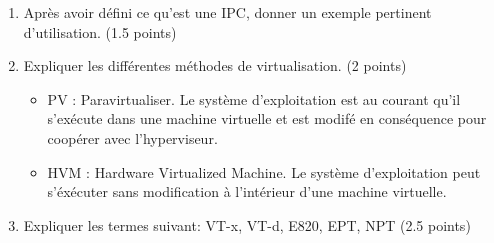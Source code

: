 \begin{enumerate}

\item Après avoir défini ce qu'est une IPC, donner un exemple pertinent d'utilisation. (1.5 points)

\item Expliquer les différentes méthodes de virtualisation. (2 points)

\begin{correction}
\begin{itemize}
\item PV : Paravirtualiser. Le système d'exploitation est au courant qu'il s'exécute dans une machine virtuelle et est modifé en conséquence pour coopérer avec l'hyperviseur.
\item HVM : Hardware Virtualized Machine. Le système d'exploitation peut s'éxécuter sans modification à l'intérieur d'une machine virtuelle.
\end{itemize}
\end{correction}

\item Expliquer les termes suivant: VT-x, VT-d, E820, EPT, NPT (2.5 points)

\end{enumerate}


